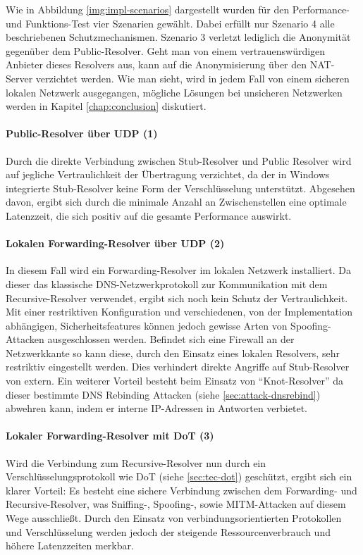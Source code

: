 Wie in Abbildung \ref{img:impl-scenarios} dargestellt wurden für den Performance- und Funktions-Test vier Szenarien gewählt. Dabei erfüllt nur Szenario 4 alle beschriebenen Schutzmechanismen. Szenario 3 verletzt lediglich die Anonymität gegenüber dem Public-Resolver. Geht man von einem vertrauenswürdigen Anbieter dieses Resolvers aus, kann auf die Anonymisierung über den NAT-Server verzichtet werden. Wie man sieht, wird in jedem Fall von einem sicheren lokalen Netzwerk ausgegangen, mögliche Lösungen bei unsicheren Netzwerken werden in Kapitel \ref{chap:conclusion} diskutiert. 

\paragraph{Public-Resolver über UDP (1)}
Durch die direkte Verbindung zwischen Stub-Resolver und Public Resolver wird auf jegliche Vertraulichkeit der Übertragung verzichtet, da der in Windows integrierte Stub-Resolver keine Form der Verschlüsselung unterstützt. Abgesehen davon, ergibt sich durch die minimale Anzahl an Zwischenstellen eine optimale Latenzzeit, die sich positiv auf die gesamte Performance auswirkt.

\paragraph{Lokalen Forwarding-Resolver über UDP (2)}
In diesem Fall wird ein Forwarding-Resolver im lokalen Netzwerk installiert. Da dieser das klassische DNS-Netzwerkprotokoll zur Kommunikation mit dem Recursive-Resolver verwendet, ergibt sich noch kein Schutz der Vertraulichkeit. Mit einer restriktiven Konfiguration und verschiedenen, von der Implementation abhängigen, Sicherheitsfeatures können jedoch gewisse Arten von Spoofing-Attacken ausgeschlossen werden. Befindet sich eine Firewall an der Netzwerkkante so kann diese, durch den Einsatz eines lokalen Resolvers, sehr restriktiv eingestellt werden. Dies verhindert direkte Angriffe auf Stub-Resolver von extern. Ein weiterer Vorteil besteht beim Einsatz von ``Knot-Resolver'' da dieser bestimmte DNS Rebinding Attacken (siehe \ref{sec:attack-dnsrebind}) abwehren kann, indem er interne IP-Adressen in Antworten verbietet\cite{KnotResolverDocRebinding}.

\paragraph{Lokaler Forwarding-Resolver mit DoT (3)}
Wird die Verbindung zum Recursive-Resolver nun durch ein Verschlüsselungsprotokoll wie DoT (siehe \ref{sec:tec-dot}) geschützt, ergibt sich ein klarer Vorteil: Es besteht eine sichere Verbindung zwischen dem Forwarding- und Recursive-Resolver, was Sniffing-, Spoofing-, sowie MITM-Attacken auf diesem Wege ausschließt. Durch den Einsatz von verbindungsorientierten Protokollen und Verschlüsselung werden jedoch der steigende Ressourcenverbrauch und höhere Latenzzeiten merkbar.


